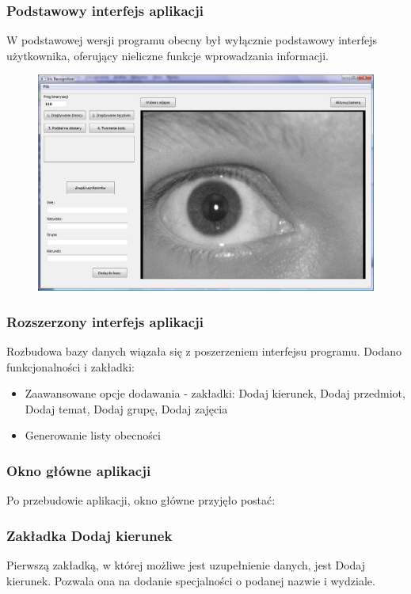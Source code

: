 \documentclass{beamer}
\begin{document}
\begin{frame}
\frametitle{Podstawowy interfejs aplikacji}
W podstawowej wersji programu obecny był wyłącznie podstawowy interfejs użytkownika, oferujący nieliczne funkcje wprowadzania informacji.
\begin{figure}
\includegraphics{oknoGlowne.jpg}
\end{figure}
\end{frame}

\begin{frame}
\frametitle{Rozszerzony interfejs aplikacji}
Rozbudowa bazy danych wiązała się z poszerzeniem interfejsu programu. Dodano funkcjonalności i zakładki:

\begin{itemize}
\item Zaawansowane opcje dodawania - zakładki: Dodaj kierunek, Dodaj przedmiot, Dodaj temat, Dodaj grupę, Dodaj zajęcia
\item Generowanie listy obecności
\end{itemize}
\end{frame}

\begin{frame}
\frametitle{Okno główne aplikacji}
Po przebudowie aplikacji, okno główne przyjęło postać:

\end{frame}

\begin{frame}
\frametitle{Zakładka Dodaj kierunek}
Pierwszą zakładką, w której możliwe jest uzupełnienie danych, jest Dodaj kierunek. Pozwala ona na dodanie specjalności o podanej nazwie i wydziale.

\end{frame}
\end{document}
